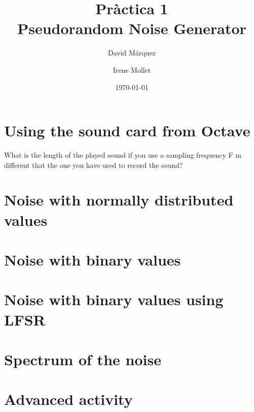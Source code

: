 \documentclass[11pt]{report}
\author{David Márquez\and Irene Mollet}
\date{\today}
\title{Pràctica 1\\Pseudorandom Noise Generator}
\begin{document}
\maketitle

\section*{Using the sound card from Octave}
What is the length of the played sound if you use a sampling frequency F m different that the
one you have used to record the sound?
\section*{Noise with normally distributed values}

\section*{Noise with binary values}

\section*{Noise with binary values using LFSR}

\section*{Spectrum of the noise}

\section*{Advanced activity}
\end{document}

